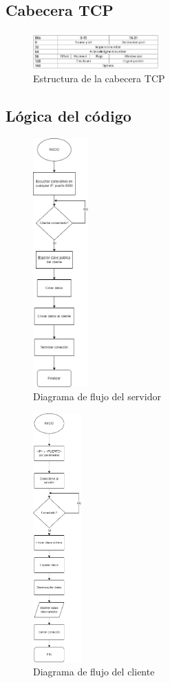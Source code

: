 \documentclass[letterpaper, 10 pt, conference]{ieeeconf}  %
\begin{document}
\subsection{Cabecera TCP}

\begin{figure}[H]
	\centering
	\includegraphics[width=0.43\textwidth]{./Imagenes/TPC_header.png}
	\caption{Estructura de la cabecera TCP}
	\label{fig:tcp_header}
\end{figure}

\subsection{Lógica del código}

\begin{figure}[H]
	\centering
	\includegraphics[height=270pt]{./Imagenes/diagrama_flujo_server.png}
	\caption{Diagrama de flujo del servidor}
	\label{fig:flujo_server}
\end{figure}

\begin{figure}[H]
	\centering
	\includegraphics[height=270pt]{./Imagenes/diag_flujo_cliente.png}
	\caption{Diagrama de flujo del cliente}
	\label{fig:flujo_cliente}
\end{figure}
\end{document}
